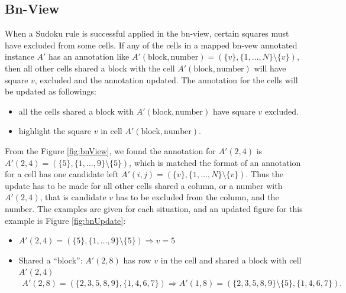 \documentclass[11pt]{report}
\newcommand{\set}[1]{\{ #1 \}}
\begin{document}
\subsection{Bn-View}
\label{sec:basicruleBn}

When a Sudoku rule is successful applied in the bn-view, certain squares must have excluded from some cells. If any of the cells in a mapped bn-vew annotated instance $A'$ has an annotation like $A'(\text{block}, \text{number}) =(\set{v}, \set{1,\dots,N} \setminus \set{v})$, then all other cells shared a block with the cell $A'(\text{block}, \text{number})$ will have square $v$, excluded and the annotation updated. The annotation for the cells will be updated as followings:
\begin{itemize}
\item all the cells shared a block with $A'(\text{block}, \text{number})$ have square $v$ excluded.
\item highlight the square $v$ in cell $A'(\text{block}, \text{number})$.
\end{itemize} 

From the Figure \ref{fig:bnView}, we found the annotation for $A'(2,4)$ is $A'(2, 4) =(\set{5}, \set{1, \dots, 9} \setminus \set{5})$, which is matched the format of an annotation for a cell has one candidate left $A'(i,j) =(\set{v}, \set{1,\dots,N} \setminus \set{v})$. Thus the update has to be made for all other cells shared a column, or a number with $A'(2,4)$, that is candidate $v$ has to be excluded from the column, and the number. The examples are given for each situation, and an updated figure for this example is Figure \ref{fig:bnUpdate}:
\begin{itemize}
\item $A'(2,4) =(\set{5}, \set{1, \dots, 9} \setminus \set{5}) \Rightarrow v = 5$
\item Shared a ``block'': $A'(2,8)$ has row $v$ in the cell and shared a block with cell $A'(2,4)$
\begin{eqnarray*}
A'(2,8) =(\set{2, 3, 5, 8, 9}, \set{1, 4, 6, 7})\Rightarrow A'(1,8) =(\set{2, 3, 5, 8, 9}\setminus \set{5}, \set{1, 4, 6, 7}).
\end{eqnarray*}
\end{itemize}
\end{document}
